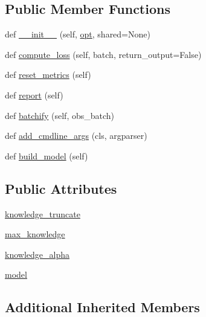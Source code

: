 \subsection*{Public Member Functions}
\begin{DoxyCompactItemize}
\item 
def \hyperlink{classgenerator_1_1agents_1_1EndToEndAgent_ac507fb4579c82550b60656fe5ed055f3}{\+\_\+\+\_\+init\+\_\+\+\_\+} (self, \hyperlink{classparlai_1_1core_1_1torch__agent_1_1TorchAgent_a785bb920cf8c8afc3e9bf6a8b77e335a}{opt}, shared=None)
\item 
def \hyperlink{classgenerator_1_1agents_1_1EndToEndAgent_ae74fbbaf5e134c46d83a89ffe0e00dc1}{compute\+\_\+loss} (self, batch, return\+\_\+output=False)
\item 
def \hyperlink{classgenerator_1_1agents_1_1EndToEndAgent_ac63595362de55d7c700d1362af372cd3}{reset\+\_\+metrics} (self)
\item 
def \hyperlink{classgenerator_1_1agents_1_1EndToEndAgent_a761044b6ad7410f5feb13e4231f60ce3}{report} (self)
\item 
def \hyperlink{classgenerator_1_1agents_1_1EndToEndAgent_a91da888e366d029cb5efa373d4858e15}{batchify} (self, obs\+\_\+batch)
\item 
def \hyperlink{classgenerator_1_1agents_1_1EndToEndAgent_af5a701f3af1cee9ac9ebf42ee108b63b}{add\+\_\+cmdline\+\_\+args} (cls, argparser)
\item 
def \hyperlink{classgenerator_1_1agents_1_1EndToEndAgent_a4350bfc0d04bf47814db2d14b95ac3bb}{build\+\_\+model} (self)
\end{DoxyCompactItemize}
\subsection*{Public Attributes}
\begin{DoxyCompactItemize}
\item 
\hyperlink{classgenerator_1_1agents_1_1EndToEndAgent_aac7481a637d9b04a437dcc5ce3f46e17}{knowledge\+\_\+truncate}
\item 
\hyperlink{classgenerator_1_1agents_1_1EndToEndAgent_aa93b8d6bb5abf0e840e51aaef52f1256}{max\+\_\+knowledge}
\item 
\hyperlink{classgenerator_1_1agents_1_1EndToEndAgent_a4102dc419ed9e709b2fa4561f2f58ac7}{knowledge\+\_\+alpha}
\item 
\hyperlink{classgenerator_1_1agents_1_1EndToEndAgent_aa5a6b4060a634d775055e2a1f830f07c}{model}
\end{DoxyCompactItemize}
\subsection*{Additional Inherited Members}


